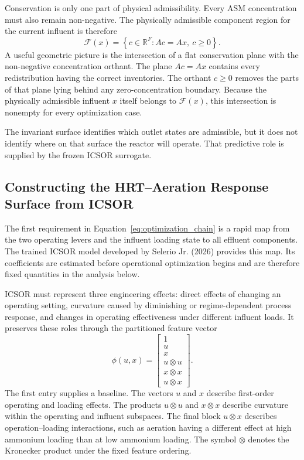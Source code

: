 \documentclass[a4paper,fleqn]{cas-sc}
\newcommand{\R}{\mathbb{R}}
\begin{document}
Conservation is only one part of physical admissibility. Every ASM concentration must also remain non-negative. The physically admissible component region for the current influent is therefore
\begin{equation}
\label{eq:physical_feasible_set}
\mathcal F(x)=\left\{c\in\R^F:Ac=Ax,\ c\geq0\right\}.
\end{equation}
A useful geometric picture is the intersection of a flat conservation plane with the non-negative concentration orthant. The plane $Ac=Ax$ contains every redistribution having the correct inventories. The orthant $c\geq0$ removes the parts of that plane lying behind any zero-concentration boundary. Because the physically admissible influent $x$ itself belongs to $\mathcal F(x)$, this intersection is nonempty for every optimization case.

The invariant surface identifies which outlet states are admissible, but it does not identify where on that surface the reactor will operate. That predictive role is supplied by the frozen ICSOR surrogate.

\subsection{Constructing the HRT--Aeration Response Surface from ICSOR}

The first requirement in Equation~\eqref{eq:optimization_chain} is a rapid map from the two operating levers and the influent loading state to all effluent components. The trained ICSOR model developed by Selerio Jr. (2026) provides this map. Its coefficients are estimated before operational optimization begins and are therefore fixed quantities in the analysis below.

ICSOR must represent three engineering effects: direct effects of changing an operating setting, curvature caused by diminishing or regime-dependent process response, and changes in operating effectiveness under different influent loads. It preserves these roles through the partitioned feature vector
\begin{equation}
\label{eq:icsor_feature_map}
\phi(u,x)=
\begin{bmatrix}
1\\
u\\
x\\
u\otimes u\\
x\otimes x\\
u\otimes x
\end{bmatrix}.
\end{equation}
The first entry supplies a baseline. The vectors $u$ and $x$ describe first-order operating and loading effects. The products $u\otimes u$ and $x\otimes x$ describe curvature within the operating and influent subspaces. The final block $u\otimes x$ describes operation--loading interactions, such as aeration having a different effect at high ammonium loading than at low ammonium loading. The symbol $\otimes$ denotes the Kronecker product under the fixed feature ordering.
\end{document}
